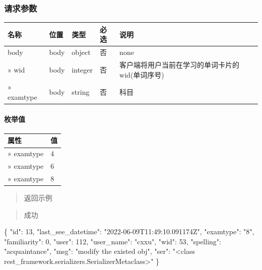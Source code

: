 \documentclass[
]{article}
\newenvironment{Shaded}{}{}
\newcommand{\DataTypeTok}[1]{\textcolor[rgb]{0.56,0.13,0.00}{#1}}
\newcommand{\DecValTok}[1]{\textcolor[rgb]{0.25,0.63,0.44}{#1}}
\newcommand{\FunctionTok}[1]{\textcolor[rgb]{0.02,0.16,0.49}{#1}}
\newcommand{\StringTok}[1]{\textcolor[rgb]{0.25,0.44,0.63}{#1}}
\begin{document}
\hypertarget{ux8bf7ux6c42ux53c2ux6570-11}{%
\subsubsection{请求参数}\label{ux8bf7ux6c42ux53c2ux6570-11}}

\begin{longtable}[]{@{}lllll@{}}
\toprule
名称 & 位置 & 类型 & 必选 & 说明 \\
\midrule
\endhead
body & body & object & 否 & none \\
» wid & body & integer & 否 &
客户端将用户当前在学习的单词卡片的wid(单词序号) \\
» examtype & body & string & 否 & 科目 \\
\bottomrule
\end{longtable}

\hypertarget{ux679aux4e3eux503c-2}{%
\paragraph{枚举值}\label{ux679aux4e3eux503c-2}}

\begin{longtable}[]{@{}ll@{}}
\toprule
属性 & 值 \\
\midrule
\endhead
» examtype & 4 \\
» examtype & 6 \\
» examtype & 8 \\
\bottomrule
\end{longtable}

\begin{quote}
返回示例
\end{quote}

\begin{quote}
成功
\end{quote}

\begin{Shaded}
\begin{Highlighting}[]
\FunctionTok{\{}
  \DataTypeTok{"id"}\FunctionTok{:} \DecValTok{13}\FunctionTok{,}
  \DataTypeTok{"last\_see\_datetime"}\FunctionTok{:} \StringTok{"2022{-}06{-}09T11:49:10.091174Z"}\FunctionTok{,}
  \DataTypeTok{"examtype"}\FunctionTok{:} \StringTok{"8"}\FunctionTok{,}
  \DataTypeTok{"familiarity"}\FunctionTok{:} \DecValTok{0}\FunctionTok{,}
  \DataTypeTok{"user"}\FunctionTok{:} \DecValTok{112}\FunctionTok{,}
  \DataTypeTok{"user\_name"}\FunctionTok{:} \StringTok{"cxxu"}\FunctionTok{,}
  \DataTypeTok{"wid"}\FunctionTok{:} \DecValTok{53}\FunctionTok{,}
  \DataTypeTok{"spelling"}\FunctionTok{:} \StringTok{"acquaintance"}\FunctionTok{,}
  \DataTypeTok{"msg"}\FunctionTok{:} \StringTok{"modify the existed obj"}\FunctionTok{,}
  \DataTypeTok{"ser"}\FunctionTok{:} \StringTok{"\textless{}class \textquotesingle{}rest\_framework.serializers.SerializerMetaclass\textquotesingle{}\textgreater{}"}
\FunctionTok{\}}
\end{Highlighting}
\end{Shaded}
\end{document}
